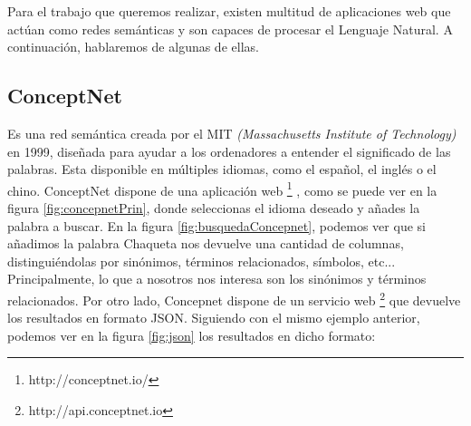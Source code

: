Para el trabajo que queremos realizar, existen multitud de aplicaciones web que actúan como redes semánticas y son capaces de procesar el Lenguaje Natural.  A continuación, hablaremos de algunas de ellas.

\subsection{ConceptNet} 
\label{cap:subsec:concepnet}

Es una red semántica creada por el MIT \textit{(Massachusetts Institute of Technology)} en 1999, diseñada para ayudar a los ordenadores a entender el significado de las palabras. Esta disponible en múltiples idiomas, como el español, el inglés o el chino. ConceptNet dispone de una aplicación web \footnote{http://conceptnet.io/} , como se puede ver en la figura \ref{fig:concepnetPrin}, donde seleccionas el idioma deseado y añades la palabra a buscar.  En la figura  \ref{fig:busquedaConcepnet}, podemos ver que si añadimos la palabra Chaqueta nos devuelve una cantidad de columnas, distinguiéndolas por sinónimos, términos relacionados, símbolos, etc... Principalmente, lo que a nosotros nos interesa son los sinónimos y términos relacionados.   
Por otro lado, Concepnet dispone de un servicio web \footnote{http://api.conceptnet.io} que devuelve los resultados en formato JSON. Siguiendo con el mismo ejemplo anterior, podemos ver en la figura  \ref{fig:json} los resultados en dicho formato:
	

